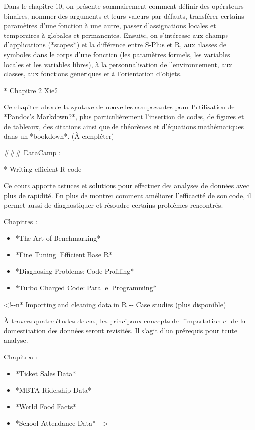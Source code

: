 \documentclass[
  letterpaper,
]{scrbook}
\begin{document}
Dans le chapitre 10, on présente sommairement comment définir des
opérateurs binaires, nommer des arguments et leurs valeurs par défauts,
transférer certains paramètres d'une fonction à une autre, passer
d'assignations locales et temporaires à globales et permanentes.
Ensuite, on s'intéresse aux champs d'applications (*scopes*) et la
différence entre S-Plus et R, aux classes de symboles dans le corps
d'une fonction (les paramètres formels, les variables locales et les
variables libres), à la personnalisation de l'environnement, aux
classes, aux fonctions génériques et à l'orientation d'objets.

* Chapitre 2 Xie2

Ce chapitre aborde la syntaxe de nouvelles composantes pour
l'utilisation de *Pandoc's Markdown?*, plus particulièrement l'insertion
de codes, de figures et de tableaux, des citations ainsi que de
théorèmes et d'équations mathématiques dans un *bookdown*. (À compléter)

\#\#\# DataCamp :

* Writing efficient R code

Ce cours apporte astuces et solutions pour effectuer des analyses de
données avec plus de rapidité. En plus de montrer comment améliorer
l'efficacité de son code, il permet aussi de diagnostiquer et résoudre
certains problèmes rencontrés.

Chapitres :

\begin{itemize}
\item
  *The Art of Benchmarking*
\item
  *Fine Tuning: Efficient Base R*
\item
  *Diagnosing Problems: Code Profiling*
\item
  *Turbo Charged Code: Parallel Programming*
\end{itemize}

\textless!-\/-n* Importing and cleaning data in R -\/- Case studies
(plus disponible)

À travers quatre études de cas, les principaux concepts de l'importation
et de la domestication des données seront revisités. Il s'agit d'un
prérequis pour toute analyse.

Chapitres :

\begin{itemize}
\item
  *Ticket Sales Data*
\item
  *MBTA Ridership Data*
\item
  *World Food Facts*
\item
  *School Attendance Data* -\/-\textgreater{}
\end{itemize}
\end{document}
